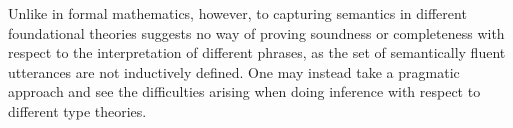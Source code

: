 Unlike in formal mathematics, however, to capturing semantics in different
foundational theories suggests no way of proving soundness or completeness with
respect to the interpretation of different phrases, as the set of semantically
fluent utterances are not inductively defined. One may instead take a pragmatic
approach and see the difficulties arising when doing inference with respect to
different type theories.

